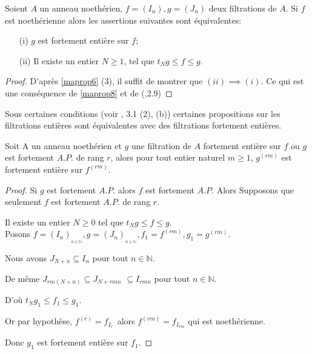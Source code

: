 \begin{maproposition}
	\label{maprop10}
	Soient $A$ un anneau noethérien, $f=(I_n) , g=(J_n)$ deux filtrations de $A$. Si $f$ est noethérienne alors les assertions suivantes sont équivalentes:
	\begin{enumerate}
		\item[(i)] $g$ est fortement entière sur $f$;
		\item[(ii)] Il existe un entier $N \geqslant 1$, tel que $t_Ng \leqslant f \leqslant g$.
	\end{enumerate}
\end{maproposition}
\begin{proof}
	D'après \ref{maprop6} (3), il suffit de montrer que $(ii) \implies (i)$. Ce qui est une conséquence de \ref{maprop8} et de (\cite{Ok},2.9)
\end{proof}
\begin{maremarque}
	\label{maprop12}
	Sous certaines conditions (voir \cite{Di1}, 3.1 (2), (b)) certaines propositions sur les filtrations entières sont équivalentes avec des filtrations fortement entières. 
\end{maremarque}
\begin{maproposition}
	Soit A un anneau noethérien et $g$ une filtration de $A$ fortement entière sur $f$ ou $g$ est fortement $A.P.$ de rang $r$, alors pour tout entier naturel $m \geqslant 1$, $g^{(rm)}$ est fortement entière sur $f^{(rm)}$.  
\end{maproposition}
\begin{proof}
	Si $g$ est fortement $A.P.$ alors $f$ est fortement $A.P.$
	Alors Supposons que seulement $f$ est fortement $A.P.$ de rang $r.$
	
	Il existe un entier $N\geq 0$ tel que $t_{N}g\leq f\leq g.$\\
	Posons $f=(I_{n})_{_{n\in \mathbb{N}}},g=(J_{n})_{_{n\in \mathbb{N}}},f_{1}=f^{(rm)},g_{1}=g^{(rm)}.$
	
	Nous avons $J_{N+n}\subseteq I_{n}$ pour tout $n\in \mathbb{N}.$
	
	De même $J_{rm(N+n)}\subseteq J_{N+rmn}$ $\subseteq I_{rmn}$  pour tout $n\in \mathbb{N}.$
	
	D'où $t_{N}g_{1}\leq f_{1}\leq g_{1}.$
	
	Or par hypothèse, $f^{(r)}=f_{I_{r}\text{ }}$alors $f^{(rm)}=f_{I_{rm}}$ qui est noethérienne.
	
	Donc $g_{1}$ est fortement entière sur $f_{1}.$
\end{proof}

